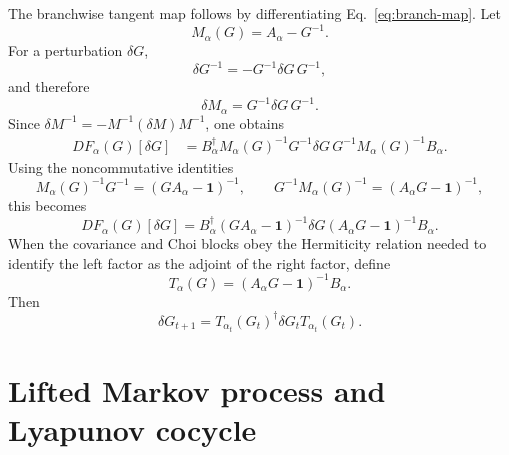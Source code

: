 \documentclass[aps,preprint,onecolumn,nofootinbib,superscriptaddress]{revtex4-2}
\newcommand{\I}{\mathbf{1}}
\theoremstyle{definition}
\theoremstyle{plain}
\begin{document}
The branchwise tangent map follows by differentiating
Eq.~\eqref{eq:branch-map}. Let
\begin{equation}
  M_\alpha(G)=A_\alpha-G^{-1}.
\end{equation}
For a perturbation \(\delta G\),
\begin{equation}
  \delta G^{-1}
  =
  -G^{-1}\delta G\,G^{-1},
\end{equation}
and therefore
\begin{equation}
  \delta M_\alpha
  =
  G^{-1}\delta G\,G^{-1}.
\end{equation}
Since \(\delta M^{-1}=-M^{-1}(\delta M)M^{-1}\), one obtains
\begin{align}
  D F_\alpha(G)[\delta G]
  &=
  B_\alpha^\dagger
  M_\alpha(G)^{-1}
  G^{-1}\delta G\,G^{-1}
  M_\alpha(G)^{-1}
  B_\alpha .
\end{align}
Using the noncommutative identities
\begin{equation}
  M_\alpha(G)^{-1}G^{-1}
  =
  (G A_\alpha-\I)^{-1},
  \qquad
  G^{-1}M_\alpha(G)^{-1}
  =
  (A_\alpha G-\I)^{-1},
\end{equation}
this becomes
\begin{equation}
  D F_\alpha(G)[\delta G]
  =
  B_\alpha^\dagger
  (G A_\alpha-\I)^{-1}
  \delta G
  (A_\alpha G-\I)^{-1}
  B_\alpha.
  \label{eq:linearization}
\end{equation}
When the covariance and Choi blocks obey the Hermiticity relation needed to
identify the left factor as the adjoint of the right factor, define
\begin{equation}
  T_\alpha(G)
  =
  (A_\alpha G-\I)^{-1}B_\alpha.
  \label{eq:tangent-transfer}
\end{equation}
Then
\begin{equation}
  \delta G_{t+1}
  =
  T_{\alpha_t}(G_t)^\dagger
  \delta G_t
  T_{\alpha_t}(G_t).
  \label{eq:tangent-update}
\end{equation}

\section{Lifted Markov process and Lyapunov cocycle}
\end{document}
